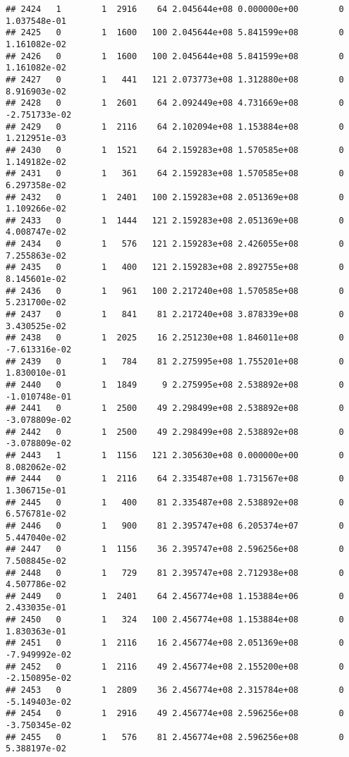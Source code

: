 \documentclass[
]{article}
\begin{document}
\begin{enumerate}
\begin{verbatim}
## 2424   1        1  2916    64 2.045644e+08 0.000000e+00        0  1.037548e-01
## 2425   0        1  1600   100 2.045644e+08 5.841599e+08        0  1.161082e-02
## 2426   0        1  1600   100 2.045644e+08 5.841599e+08        0  1.161082e-02
## 2427   0        1   441   121 2.073773e+08 1.312880e+08        0  8.916903e-02
## 2428   0        1  2601    64 2.092449e+08 4.731669e+08        0 -2.751733e-02
## 2429   0        1  2116    64 2.102094e+08 1.153884e+08        0  1.212951e-03
## 2430   0        1  1521    64 2.159283e+08 1.570585e+08        0  1.149182e-02
## 2431   0        1   361    64 2.159283e+08 1.570585e+08        0  6.297358e-02
## 2432   0        1  2401   100 2.159283e+08 2.051369e+08        0  1.109266e-02
## 2433   0        1  1444   121 2.159283e+08 2.051369e+08        0  4.008747e-02
## 2434   0        1   576   121 2.159283e+08 2.426055e+08        0  7.255863e-02
## 2435   0        1   400   121 2.159283e+08 2.892755e+08        0  8.145601e-02
## 2436   0        1   961   100 2.217240e+08 1.570585e+08        0  5.231700e-02
## 2437   0        1   841    81 2.217240e+08 3.878339e+08        0  3.430525e-02
## 2438   0        1  2025    16 2.251230e+08 1.846011e+08        0 -7.613316e-02
## 2439   0        1   784    81 2.275995e+08 1.755201e+08        0  1.830010e-01
## 2440   0        1  1849     9 2.275995e+08 2.538892e+08        0 -1.010748e-01
## 2441   0        1  2500    49 2.298499e+08 2.538892e+08        0 -3.078809e-02
## 2442   0        1  2500    49 2.298499e+08 2.538892e+08        0 -3.078809e-02
## 2443   1        1  1156   121 2.305630e+08 0.000000e+00        0  8.082062e-02
## 2444   0        1  2116    64 2.335487e+08 1.731567e+08        0  1.306715e-01
## 2445   0        1   400    81 2.335487e+08 2.538892e+08        0  6.576781e-02
## 2446   0        1   900    81 2.395747e+08 6.205374e+07        0  5.447040e-02
## 2447   0        1  1156    36 2.395747e+08 2.596256e+08        0  7.508845e-02
## 2448   0        1   729    81 2.395747e+08 2.712938e+08        0  4.507786e-02
## 2449   0        1  2401    64 2.456774e+08 1.153884e+06        0  2.433035e-01
## 2450   0        1   324   100 2.456774e+08 1.153884e+08        0  1.830363e-01
## 2451   0        1  2116    16 2.456774e+08 2.051369e+08        0 -7.949992e-02
## 2452   0        1  2116    49 2.456774e+08 2.155200e+08        0 -2.150895e-02
## 2453   0        1  2809    36 2.456774e+08 2.315784e+08        0 -5.149403e-02
## 2454   0        1  2916    49 2.456774e+08 2.596256e+08        0 -3.750345e-02
## 2455   0        1   576    81 2.456774e+08 2.596256e+08        0  5.388197e-02

\end{verbatim}
\end{enumerate}
\end{document}
